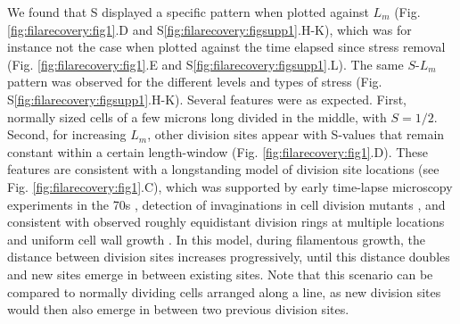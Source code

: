 We found that S displayed a specific pattern when plotted against $L_m$ (Fig. \ref{fig:filarecovery:fig1}.D and S\ref{fig:filarecovery:figsupp1}.H-K), which was for instance not the case when plotted against the time elapsed since stress removal (Fig. \ref{fig:filarecovery:fig1}.E and S\ref{fig:filarecovery:figsupp1}.L). The same $S$-$L_m$ pattern was observed for the different levels and types of stress (Fig. S\ref{fig:filarecovery:figsupp1}.H-K). Several features were as expected. First, normally sized cells of a few microns long divided in the middle, with $S = 1/2$. Second, for increasing $L_m$, other division sites appear with S-values that remain constant within a certain length-window (Fig. \ref{fig:filarecovery:fig1}.D). These features are consistent with a longstanding model of division site locations (see Fig. \ref{fig:filarecovery:fig1}.C), which was supported by early time-lapse microscopy experiments in the 70s \cite{Donachie1970}, detection of invaginations in cell division mutants \cite{Taschner1988}, and consistent with observed roughly equidistant division rings at multiple locations \cite{Addinall1997, Arjes2014, Mileykovskaya1998} and uniform cell wall growth \cite{Typas2012}. In this model, during filamentous growth, the distance between division sites increases progressively, until this distance doubles and new sites emerge in between existing sites. Note that this scenario can be compared to normally dividing cells arranged along a line, as new division sites would then also emerge in between two previous division sites.

